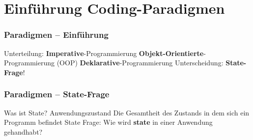 

\section{Einführung Coding-Paradigmen}%
\begin{frame}%
    \frametitle{Paradigmen -- Einführung}

    \begin{outline}
        \0 \large Unterteilung:
            \1 \textbf{Imperative}-Programmierung
                \2 \textbf{Objekt-Orientierte}-Programmierung (OOP)
                \vspace{.3em}
            \1 \textbf{Deklarative}-Programmierung
            \vspace{3em}
            \0 Unterscheidung: \textbf{State-Frage}!
    \end{outline}

\end{frame}







\begin{frame}%
    \frametitle{Paradigmen -- State-Frage}

    \begin{outline}
        \0 Was ist State?
            \1 Anwendungszustand
            \1 Die Gesamtheit des Zustands in dem sich ein Programm befindet
            \vspace{.3em}
        \0 State Frage: Wie wird \textbf{state} in einer Anwendung gehandhabt?
    \end{outline}

\end{frame}


